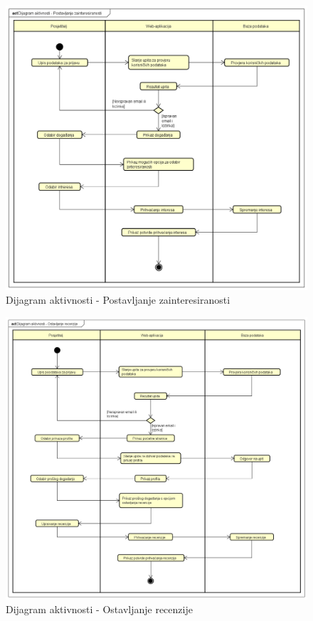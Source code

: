 			\begin{figure}[H]
			\includegraphics[width=\textwidth]{slike/Dijagram Aktivnosti - PZ.PNG} %
			\caption{Dijagram aktivnosti - Postavljanje zainteresiranosti}
			\label{fig:DAPZ} %
		\end{figure}	
		
		\begin{figure}[H]
			\includegraphics[width=\textwidth]{slike/Dijagram Aktivnosti - OR.PNG} %
			\caption{Dijagram aktivnosti - Ostavljanje recenzije}
			\label{fig:DAOR} %
		\end{figure}			
			
